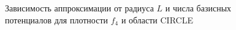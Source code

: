 \documentclass[a4paper, 12pt]{article}
\begin{document}
        \begin{figure}[h!]
          \noindent{}
          \caption{Зависимость аппроксимации от радиуса $L$ и числа базисных потенциалов для плотности $f_4$ и области CIRCLE}
          \label{nolnol}
          \end{figure}       
\end{document}
